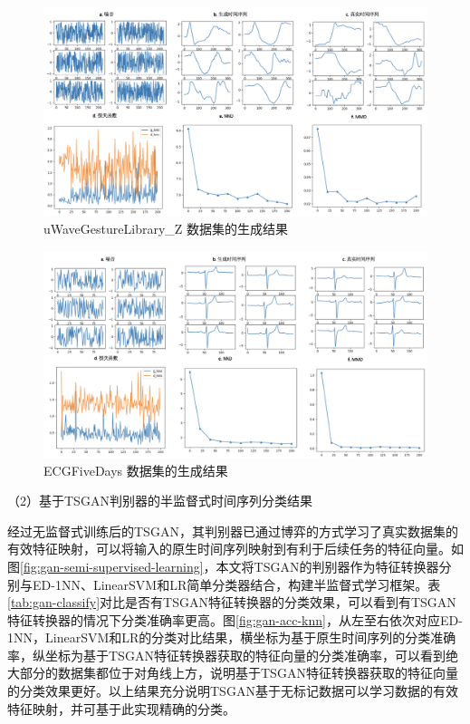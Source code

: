 \begin{figure}[H]
\centering
\includegraphics[scale=0.5]{figures/gan/uWaveGestureLibrary_Z.png}
\caption{uWaveGestureLibrary\_Z 数据集的生成结果}
\label{fig:gan-show-uWaveGestureLibrary_Z}
\end{figure}
\begin{figure}[H]
\centering
\includegraphics[scale=0.5]{figures/gan/ECGFiveDays.png}
\caption{ECGFiveDays 数据集的生成结果}
\label{fig:gan-show-ECGFiveDays}
\end{figure}


（2）基于TSGAN判别器的半监督式时间序列分类结果

经过无监督式训练后的TSGAN，其判别器已通过博弈的方式学习了真实数据集的有效特征映射，可以将输入的原生时间序列映射到有利于后续任务的特征向量。如图\ref{fig:gan-semi-supervised-learning}，本文将TSGAN的判别器作为特征转换器分别与ED-1NN、LinearSVM和LR简单分类器结合，构建半监督式学习框架。表\ref{tab:gan-classify}对比是否有TSGAN特征转换器的分类效果，可以看到有TSGAN特征转换器的情况下分类准确率更高。图\ref{fig:gan-acc-knn}，从左至右依次对应ED-1NN，LinearSVM和LR的分类对比结果，横坐标为基于原生时间序列的分类准确率，纵坐标为基于TSGAN特征转换器获取的特征向量的分类准确率，可以看到绝大部分的数据集都位于对角线上方，说明基于TSGAN特征转换器获取的特征向量的分类效果更好。以上结果充分说明TSGAN基于无标记数据可以学习数据的有效特征映射，并可基于此实现精确的分类。

